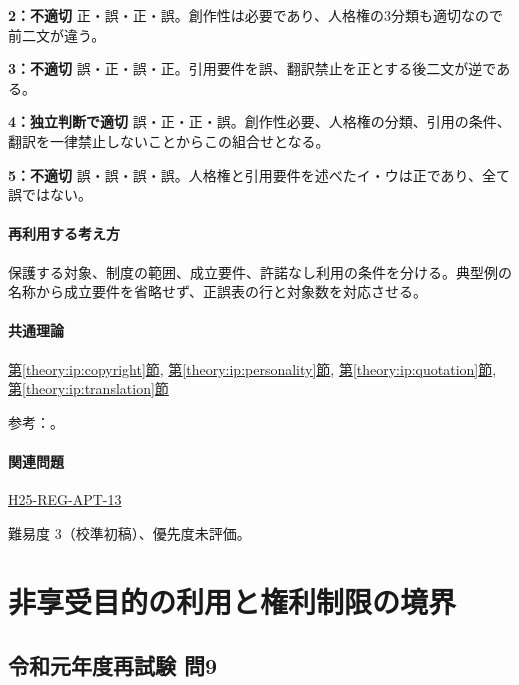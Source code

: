 \noindent\textbf{2：不適切} 正・誤・正・誤。創作性は必要であり、人格権の3分類も適切なので前二文が違う。\par

\noindent\textbf{3：不適切} 誤・正・誤・正。引用要件を誤、翻訳禁止を正とする後二文が逆である。\par

\noindent\textbf{4：独立判断で適切} 誤・正・正・誤。創作性必要、人格権の分類、引用の条件、翻訳を一律禁止しないことからこの組合せとなる。\par

\noindent\textbf{5：不適切} 誤・誤・誤・誤。人格権と引用要件を述べたイ・ウは正であり、全て誤ではない。\par

\paragraph{再利用する考え方} 保護する対象、制度の範囲、成立要件、許諾なし利用の条件を分ける。典型例の名称から成立要件を省略せず、正誤表の行と対象数を対応させる。

\paragraph{共通理論} \hyperref[theory:ip:copyright]{第\ref*{theory:ip:copyright}節}, \hyperref[theory:ip:personality]{第\ref*{theory:ip:personality}節}, \hyperref[theory:ip:quotation]{第\ref*{theory:ip:quotation}節}, \hyperref[theory:ip:translation]{第\ref*{theory:ip:translation}節}

\par 参考：\cite{ip_copyright_statute}。

\paragraph{関連問題} \hyperref[q:h25-reg-apt-13]{H25-REG-APT-13}

\par 難易度 3（校準初稿）、優先度未評価。

\section{非享受目的の利用と権利制限の境界}

\subsection{令和元年度再試験 問9}
\label{q:r01-ret-apt-09}

